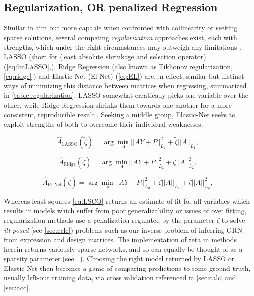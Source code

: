 \subsection{Regularization, OR penalized Regression}
\label{sec:reg}
Similar in aim but more capable when confronted with collinearity or seeking sparse solutions, several competing \emph{regularization} approaches exist, each with strengths, which under the right circumstances may outweigh any limitations \citep[p.69-73,661-668]{friedman2001elements}. LASSO (short for (least absolute shrinkage and selection operator) (\cref{eq:linLASSO},\citep{tibshirani1996regression}), Ridge Regression (also known as Tikhonov regularization, \cref{eq:ridge} \citep{hoerl1970ridge}) and Elastic-Net (El-Net) (\cref{eq:EL}\citep{zou2005regularization}) are, in effect, similar but distinct ways of minimizing this distance between matrices when regressing, summarized in \cref{table:regularization}. LASSO somewhat erratically picks one variable over the other, while Ridge Regression shrinks them towards one another for a more consistent, reproducible result \citep{ng2004feature,tibshirani1996regression}. Seeking a middle group, Elastic-Net seeks to exploit strengths of both to overcome their individual weaknesses.

 \begin{equation}\label{eq:linLASSO}
  \hat{A}_{\textrm{LASSO}}(\tilde{\zeta}) = \arg \min_{A} ||A Y+P||^2_{L_2} + \tilde{\zeta} ||A||_{L_1},
\end{equation}

 \begin{equation}\label{eq:ridge}
  \hat{A}_{\textrm{Ridge}}(\tilde{\zeta}) = \arg \min_{A} ||A Y+P||^2_{L_2} + \tilde{\zeta} ||A||^2_{L_2},
\end{equation}

 \begin{equation}\label{eq:EL}
  \hat{A}_{\textrm{El-Net}}(\tilde{\zeta}) = \arg \min_{A} ||A Y+P||^2_{L_2} + \tilde{\zeta} ||A||_{L_1}+ \tilde{\zeta} ||A||^2_{L_2},
\end{equation}

Whereas least squares \cref{eq:LSCO} returns an estimate of fit for all variables which results in models which suffer from poor generalizability or issues of over fitting, regularization methods use a penalization regulated by the parameter $\zeta$ to solve \emph{ill-posed} (see \cref{sec:calc}) problems such as our inverse problem of inferring GRN from expression and design matrices. The implementation of zeta in methods herein returns variously sparse networks, and so can equally be thought of as a sparsity parameter (see ~). Choosing the right model returned by LASSO or Elastic-Net then becomes a game of comparing predictions to some ground truth, usually left-out training data, \ie via cross validation referenced in \cref{sec:calc} and \cref{sec:acc}.

